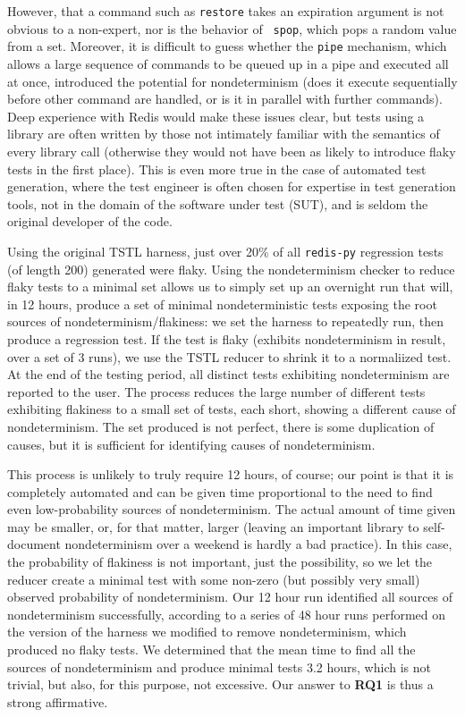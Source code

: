 However, that a command such as {\tt restore} takes an expiration
argument is not obvious to a non-expert, nor is the behavior of {\tt
  spop}, which pops a random value from a set.  Moreover, it is
difficult to guess whether the {\tt pipe} mechanism, which allows a
large sequence of commands to be queued up in a pipe and executed all
at once, introduced the potential for nondeterminism (does it execute
sequentially before other command are handled, or is it in parallel
with further commands).  Deep experience with Redis would make these
issues clear, but tests using a library are often written by those not
intimately familiar with the semantics of every library call (otherwise they would not have
been as likely to introduce flaky tests in the first place).  This is
even more true in the case of automated test generation, where the
test engineer is often chosen for expertise in test generation tools,
not in the domain of the software under test (SUT), and is seldom the
original developer of the code.

Using the original TSTL harness, just over 20\% of all {\tt redis-py}
regression tests (of length 200) generated were flaky.  Using the
nondeterminism checker to reduce flaky tests to a minimal set allows
us to simply set up an overnight run that will, in 12 hours, produce
a set of minimal nondeterministic tests exposing the root sources of
nondeterminism/flakiness: we set the harness to repeatedly run, then
produce a regression test.  If the test is flaky (exhibits
nondeterminism in result, over a set of 3 runs), we use the TSTL reducer to shrink it to a
normaliized \cite{onetest} test.  At the end of the testing period,
all distinct tests exhibiting nondeterminism are reported to the
user.  The process reduces the large number of different tests
exhibiting flakiness to a small set of tests, each short, showing a
different cause of nondeterminism.  The set produced is not perfect,
there is some duplication of causes, but it is sufficient for
identifying causes of nondeterminism.

This process is unlikely to truly require 12
hours, of course; our point is that it is completely automated and
can be given time proportional to the need to find even
low-probability sources of nondeterminism.  The actual amount of time given
may be smaller, or, for that matter, larger (leaving an important
library to self-document nondeterminism over a weekend is hardly a bad
practice).  In this case, the probability of flakiness
is not important, just the possibility, so we let the reducer
create a minimal test with some non-zero (but possibly very small)
observed probability of nondeterminism.  Our 12 hour run identified
all sources of nondeterminism successfully, according to a series of
48 hour runs performed on the version of the harness we modified to
remove nondeterminism, which produced no flaky tests.  We determined that the mean time to find all
the sources of nondeterminism and produce minimal tests 3.2
hours, which is not trivial, but also, for this purpose, not
excessive.  Our answer to {\bf RQ1} is thus a strong affirmative.

